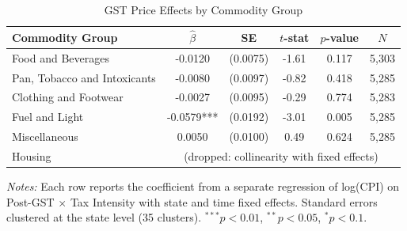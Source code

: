 \begin{table}[htbp]
\centering
\caption{GST Price Effects by Commodity Group}
\label{tab:commodity}
\begin{tabular}{lccccc}
\toprule
Commodity Group & $\hat{\beta}$ & SE & $t$-stat & $p$-value & $N$ \\
\midrule
Food and Beverages & -0.0120 & (0.0075) & -1.61 & 0.117 & 5,303 \\
Pan, Tobacco and Intoxicants & -0.0080 & (0.0097) & -0.82 & 0.418 & 5,285 \\
Clothing and Footwear & -0.0027 & (0.0095) & -0.29 & 0.774 & 5,283 \\
Fuel and Light & -0.0579*** & (0.0192) & -3.01 & 0.005 & 5,285 \\
Miscellaneous & 0.0050 & (0.0100) & 0.49 & 0.624 & 5,285 \\
Housing & \multicolumn{5}{c}{(dropped: collinearity with fixed effects)} \\
\bottomrule
\end{tabular}
\begin{tablenotes}[flushleft]\small
\item \textit{Notes:} Each row reports the coefficient from a separate regression of log(CPI) on Post-GST $\times$ Tax Intensity with state and time fixed effects. Standard errors clustered at the state level (35 clusters). $^{***}p<0.01$, $^{**}p<0.05$, $^{*}p<0.1$.
\end{tablenotes}
\end{table}
